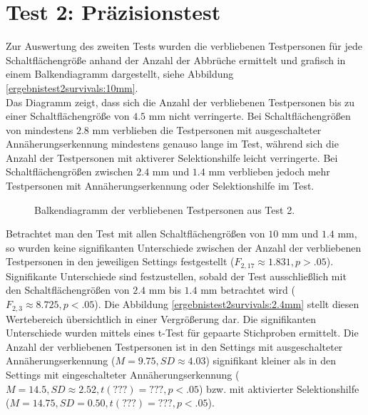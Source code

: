 \documentclass[12pt,bibliography=totocnumbered,listof=totocnumbered,abstracton]{scrreprt}
\begin{document}
\section{Test 2: Präzisionstest}
Zur Auswertung des zweiten Tests wurden die verbliebenen Testpersonen für jede Schaltflächengröße anhand der Anzahl der Abbrüche ermittelt und grafisch in einem Balkendiagramm dargestellt, siehe Abbildung \ref{ergebnistest2survivals:10mm}.\\
Das Diagramm zeigt, dass sich die Anzahl der verbliebenen Testpersonen bis zu einer Schaltflächengröße von $4.5$ mm nicht verringerte. Bei Schaltflächengrößen von mindestens $2.8$ mm verblieben die Testpersonen mit ausgeschalteter Annäherungserkennung mindestens genauso lange im Test, während sich die Anzahl der Testpersonen mit aktiverer Selektionshilfe leicht verringerte. Bei Schaltflächengrößen zwischen $2.4$ mm und $1.4$ mm verblieben jedoch mehr Testpersonen mit Annäherungserkennung oder Selektionshilfe im Test.\\
\begin{figure}
\centering
{}
\caption{Balkendiagramm der verbliebenen Testpersonen aus Test 2.}
\label{ergebnistest2survivals}
\end{figure}
Betrachtet man den Test mit allen Schaltflächengrößen von $10$ mm und $1.4$ mm, so wurden keine signifikanten Unterschiede zwischen der Anzahl der verbliebenen Testpersonen in den jeweiligen Settings festgestellt ($F_{2,17}\approx 1.831, p > .05$). Signifikante Unterschiede sind festzustellen, sobald der Test ausschließlich mit den Schaltflächengrößen von $2.4$ mm bis $1.4$ mm betrachtet wird ($F_{2,3}\approx 8.725, p < .05$). Die Abbildung \ref{ergebnistest2survivals:2.4mm} stellt diesen Wertebereich übersichtlich in einer Vergrößerung dar. Die signifikanten Unterschiede wurden mittels eines t-Test für gepaarte Stichproben ermittelt. Die Anzahl der verbliebenen Testpersonen ist in den Settings mit ausgeschalteter Annäherungserkennung ($M = 9.75, SD\approx 4.03$) signifikant kleiner als in den Settings mit eingeschalteter Annäherungserkennung ($M = 14.5, SD\approx 2.52, t(???) =??? , p < .05$) bzw. mit aktivierter Selektionshilfe ($M = 14.75, SD = 0.50, t(???) = ??? , p < .05$).
\end{document}
